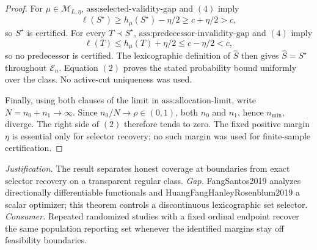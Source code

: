 \documentclass{article}
\begin{document}
\begin{proof}
For \(\mu\in\mathcal M_{L,\eta}\), \(\text{ass:selected-validity-gap}\) and \((4)\) imply
\[
\ell(S^\star)\geq h_{\mu}(S^\star)-\eta/2\geq c+\eta/2>c,
\]
so \(S^\star\) is certified.  For every \(T\prec S^\star\), \(\text{ass:predecessor-invalidity-gap}\) and \((4)\) imply
\[
\ell(T)\leq h_{\mu}(T)+\eta/2\leq c-\eta/2<c,
\]
so no predecessor is certified.  The lexicographic definition of \(\widehat S\) then gives \(\widehat S=S^\star\) throughout \(\mathcal E_n\).  Equation \((2)\) proves the stated probability bound uniformly over the class.  No active-cut uniqueness was used.

Finally, using both clauses of the limit in \(\text{ass:allocation-limit}\), write \(N=n_0+n_1\to\infty\).  Since \(n_0/N\to\rho\in(0,1)\), both \(n_0\) and \(n_1\), hence \(n_{\min}\), diverge.  The right side of \((2)\) therefore tends to zero.  The fixed positive margin \(\eta\) is essential only for selector recovery; no such margin was used for finite-sample certification.
\end{proof}
\par\smallskip\noindent \textit{Justification.} The result separates honest coverage at boundaries from exact selector recovery on a transparent regular class. \textit{Gap.} FangSantos2019 analyzes directionally differentiable functionals and HuangFangHanleyRosenblum2019 a scalar optimizer; this theorem controls a discontinuous lexicographic set selector. \textit{Consumer.} Repeated randomized studies with a fixed ordinal endpoint recover the same population reporting set whenever the identified margins stay off feasibility boundaries.
\end{document}
